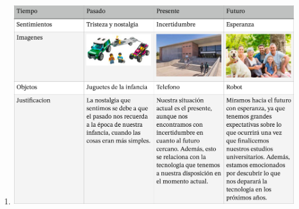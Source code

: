 \documentclass[10pt, a4paper]{article}
\begin{document}
\begin{enumerate}
    \item \includegraphics[width=1\textwidth]{cuadro.jpg}
        
    \end{enumerate}
    
\end{document}
